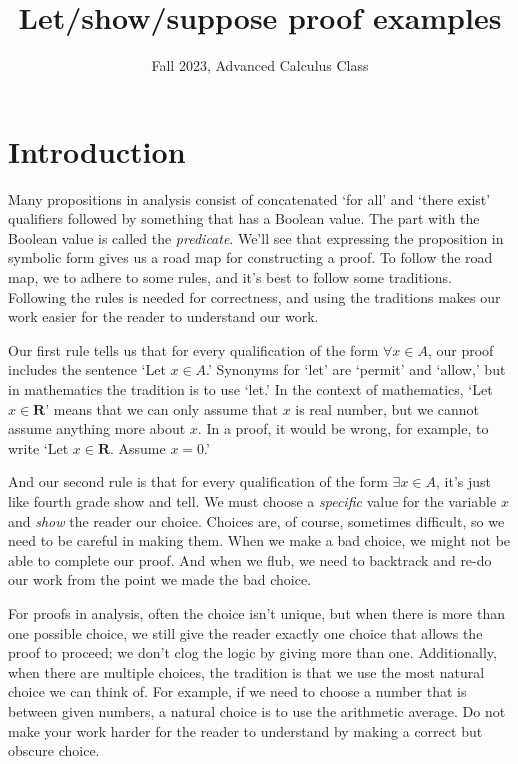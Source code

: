 \documentclass[12pt,fleqn]{article}
\title{Let/show/suppose proof examples}
\author{Fall 2023, Advanced Calculus Class}
\newcommand{\reals}{\mathbf{R}}
\newcounter{ex}\setcounter{ex}{0}
\begin{document}
\maketitle

\section{Introduction}


Many propositions in analysis consist of concatenated `for all' and `there exist'  qualifiers followed by something that has a Boolean value.  
The part with the Boolean value is called the \emph{predicate}. We'll see that expressing the proposition in symbolic 
form gives us a road map for constructing  a proof. To follow the road map, we to 
adhere to some rules, and it's best to follow some traditions.  Following the rules is 
needed for correctness,  and using the traditions makes 
 our work easier for the reader  to understand our work.

Our first rule tells us that for every qualification of the form $\forall x \in A$, our proof includes the sentence `Let $x \in A$.'  Synonyms  for  `let' 
are `permit' and `allow,' but in mathematics the tradition is to use `let.' In the 
context of mathematics, `Let $x \in \reals$' means that we can only assume that 
$x$ is real number, but we cannot assume anything more about $x$. In a proof, it
 would be wrong, for example, to write `Let $x \in \reals$. Assume $x = 0$.'

And our second rule is that for every qualification of the form $\exists x \in A$, it's just like fourth grade show and tell. We must choose a \emph{specific} value for the  variable $x$ and \emph{show} the reader our choice. Choices are, of course, sometimes difficult, so we need to 
be careful in making them. When we make a bad choice, we might not be able to complete our proof.  And when we flub, we need to backtrack 
and re-do our work from the point we made the bad choice.

For proofs in analysis, often the choice isn't unique, but when there is more than one possible choice,
we still give the reader exactly one choice that allows the proof to proceed; we don't clog the logic by giving more than one.
Additionally, when there are multiple choices, the tradition is that we use the most natural choice we can think of. For example, if 
we need to choose a number that is between given numbers, a natural choice is to use the arithmetic average. Do not make your
 work harder for the reader to understand  by making a correct but obscure choice.
\end{document}
